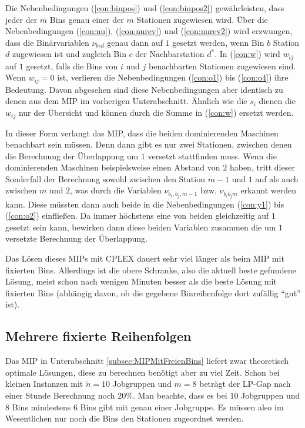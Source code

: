 \documentclass{scrreprt}
\begin{document}
Die Nebenbedingungen (\ref{con:binpos}) und (\ref{con:binpos2}) gewährleisten, dass jeder der $m$ Bins genau einer der $m$ Stationen zugewiesen wird.
Über die Nebenbedingungen (\ref{con:nu}), (\ref{con:nurev}) und (\ref{con:nurev2}) wird erzwungen, dass die Binärvariablen
$\nu_{bcd}$ genau dann auf $1$ gesetzt werden, wenn Bin $b$ Station $d$ zugewiesen ist und zugleich Bin $c$ der Nachbarstation $d^*$.
In (\ref{con:w}) wird $w_{ij}$ auf $1$ gesetzt, falls die Bins von $i$ und $j$ benachbarten Stationen zugewiesen sind.
Wenn $w_{ij}=0$ ist, verlieren die Nebenbedingungen (\ref{con:o1}) bis (\ref{con:o4}) ihre Bedeutung.
Davon abgesehen sind diese Nebenbedingungen aber identisch zu denen aus dem MIP im vorherigen Unterabschnitt.
Ähnlich wie die $s_i$ dienen die $w_{ij}$ nur der Übersicht und können durch die Summe in (\ref{con:w}) ersetzt werden.

In dieser Form verlangt das MIP, dass die beiden dominierenden Maschinen benachbart sein müssen.
Denn dann gibt es nur zwei Stationen, zwischen denen die Berechnung der Überlappung um $1$ versetzt stattfinden muss.
Wenn die dominierenden Maschinen beispielsweise einen Abstand von $2$ haben,
tritt dieser Sonderfall der Berechnung sowohl zwischen den Station $m-1$ und $1$ auf als auch zwischen $m$ und $2$,
was durch die Variablen $\nu_{b_i,b_j,m-1}$ bzw. $\nu_{b_ib_jm}$ erkannt werden kann.
Diese müssten dann auch beide in die Nebenbedingungen (\ref{con:y1}) bis (\ref{con:o2}) einfließen.
Da immer höchstens eine von beiden gleichzeitig auf $1$ gesetzt sein kann, 
bewirken dann diese beiden Variablen zusammen die um $1$ versetzte Berechnung der Überlappung.

Das Lösen dieses MIPs mit CPLEX dauert sehr viel länger als beim MIP mit fixierten Bins.
Allerdings ist die obere Schranke, also die aktuell beste gefundene Lösung, meist schon nach wenigen Minuten besser als die
beste Lösung mit fixierten Bins (abhängig davon, ob die gegebene Binreihenfolge dort zufällig "`gut"' ist).

\subsection{Mehrere fixierte Reihenfolgen}
Das MIP in Unterabschnitt \ref{subsec:MIPMitFreienBins} liefert zwar theoretisch optimale Lösungen, diese zu berechnen benötigt aber zu viel Zeit.
Schon bei kleinen Instanzen mit $\tilde{n}=10$ Jobgruppen und $m=8$ beträgt der LP-Gap nach einer Stunde Berechnung noch $20\%$.
Man beachte, dass es bei $10$ Jobgruppen und $8$ Bins mindestens $6$ Bins gibt mit genau einer Jobgruppe.
Es müssen also im Wesentlichen nur noch die Bins den Stationen zugeordnet werden.
\end{document}
